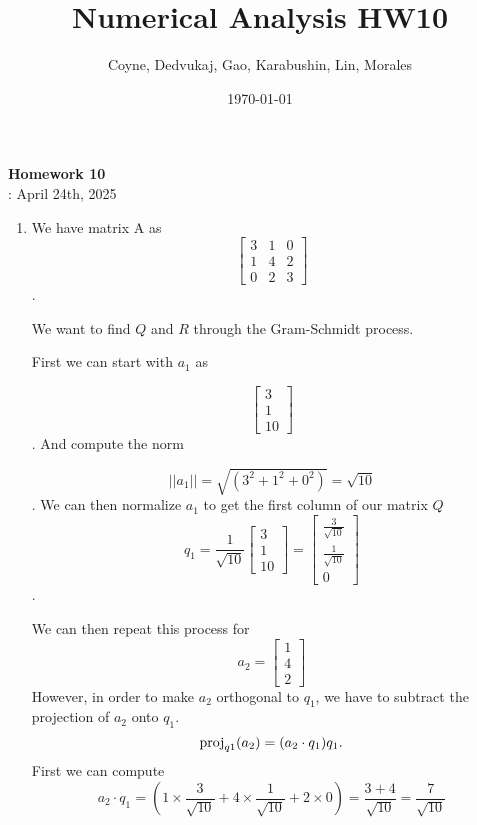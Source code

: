\documentclass[12pt]{article}
\title{Numerical Analysis HW10}
\author{Coyne, Dedvukaj, Gao, Karabushin, Lin, Morales}
\date{\today}
\begin{document}
\pagestyle{fancy}


\begin{center}
\textbf{\Large Homework 10} \\
: April 24th, 2025
\end{center}

\begin{enumerate}[leftmargin=0em]
    \item
    We have matrix A as 
    \[\begin{bmatrix}
        3 & 1 & 0 \\
        1 & 4 & 2 \\
        0 & 2 & 3
    \end{bmatrix} \].

    We want to find $Q$ and $R$ through the Gram-Schmidt process.

    First we can start with $a_1$ as 

    \[ \begin{bmatrix}
        3 \\
        1 \\ 
        10
    \end{bmatrix}
    \]. And compute the norm

    \[ ||a_1|| = \sqrt{(3^{2} + 1^{2}+0^{2})} = \sqrt{10}\].
    We can then normalize $a_1$ to get the first column of our matrix $Q$
    \[ q_1 = \frac{1}{\sqrt{10}} \begin{bmatrix}
        3 \\
        1\\
        10
    \end{bmatrix} = \begin{bmatrix}
        \frac{3}{\sqrt{10}} \\
        \frac{1}{\sqrt{10}} \\
        0
    \end{bmatrix}\]. 

    We can then repeat this process for \[a_2 = \begin{bmatrix}
        1 \\
        4 \\
        2
    \end{bmatrix}\] However, in order to make $a_2$ orthogonal to $q_1$, we have to subtract the projection of $a_2$ onto $q_1$. 
    \[ \operatorname{proj}_{q1}(a_2) = (a_2 \cdot q_1)q_1.
        \]
        First we can compute
        \[ a_2 \cdot q_1 = (1 \times \frac{3}{\sqrt{10}} + 4 \times \frac{1}{\sqrt{10}} + 2 \times 0) = \frac{3+4}{\sqrt{10}} = \frac{7}{\sqrt{10}}\]


\end{enumerate}
\end{document}
